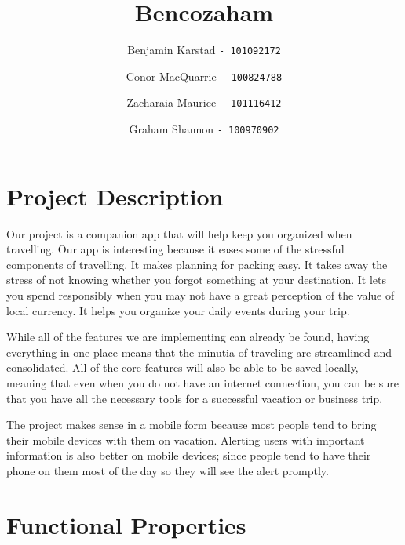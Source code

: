 \documentclass[12pt]{article}
\title{Bencozaham}
\author{
	Benjamin Karstad
	\texttt{- 101092172}
	\and
	Conor MacQuarrie
	\texttt{- 100824788}
	\and
	Zacharaia Maurice
	\texttt{- 101116412}
	\and
	Graham Shannon
	\texttt{- 100970902}
}
\begin{document}
\maketitle

\section*{Project Description}

Our project is a companion app that will help keep you organized when travelling.
Our app is interesting because it eases some of the stressful components of travelling.
It makes planning for packing easy.
It takes away the stress of not knowing whether you forgot something at your destination.
It lets you spend responsibly when you may not have a great perception of the value of local currency.
It helps you organize your daily events during your trip.

While all of the features we are implementing can already be found,
having everything in one place means that the minutia of traveling are streamlined and consolidated.
All of the core features will also be able to be saved locally, meaning that even when you do not have an internet connection,
you can be sure that you have all the necessary tools for a successful vacation or business trip.

The project makes sense in a mobile form because most people tend to bring their mobile devices with them on vacation.
Alerting users with important information is also better on mobile devices;
since people tend to have their phone on them most of the day so they will see the alert promptly.

\pagebreak

\section*{Functional Properties}
\end{document}
